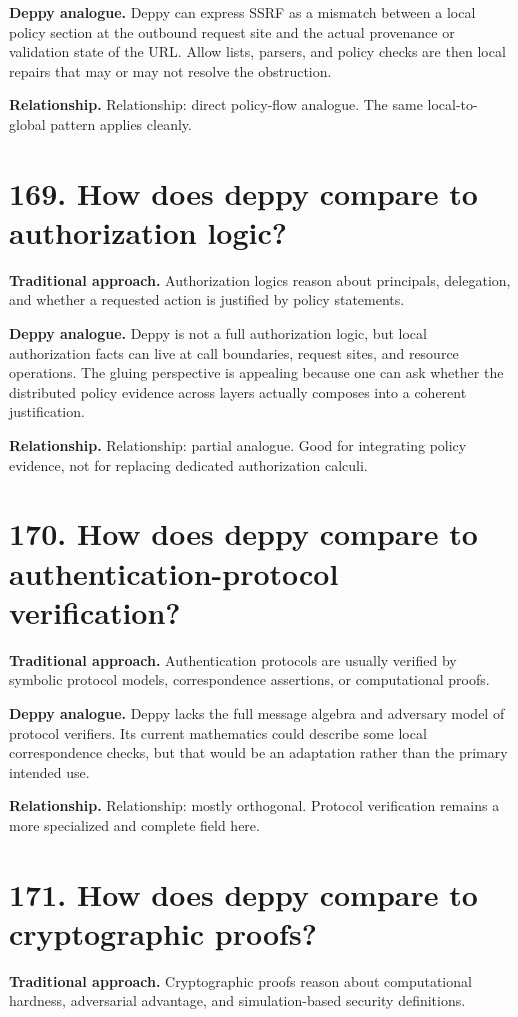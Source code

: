 \documentclass[11pt,openany]{book}
\begin{document}
\textbf{Deppy analogue.} Deppy can express SSRF as a mismatch between a local policy section at the outbound request site and the actual provenance or validation state of the URL. Allow lists, parsers, and policy checks are then local repairs that may or may not resolve the obstruction.

\textbf{Relationship.} Relationship: direct policy-flow analogue. The same local-to-global pattern applies cleanly.

\section*{169. How does deppy compare to authorization logic?}
\textbf{Traditional approach.} Authorization logics reason about principals, delegation, and whether a requested action is justified by policy statements.

\textbf{Deppy analogue.} Deppy is not a full authorization logic, but local authorization facts can live at call boundaries, request sites, and resource operations. The gluing perspective is appealing because one can ask whether the distributed policy evidence across layers actually composes into a coherent justification.

\textbf{Relationship.} Relationship: partial analogue. Good for integrating policy evidence, not for replacing dedicated authorization calculi.

\section*{170. How does deppy compare to authentication-protocol verification?}
\textbf{Traditional approach.} Authentication protocols are usually verified by symbolic protocol models, correspondence assertions, or computational proofs.

\textbf{Deppy analogue.} Deppy lacks the full message algebra and adversary model of protocol verifiers. Its current mathematics could describe some local correspondence checks, but that would be an adaptation rather than the primary intended use.

\textbf{Relationship.} Relationship: mostly orthogonal. Protocol verification remains a more specialized and complete field here.

\section*{171. How does deppy compare to cryptographic proofs?}
\textbf{Traditional approach.} Cryptographic proofs reason about computational hardness, adversarial advantage, and simulation-based security definitions.
\end{document}
